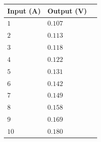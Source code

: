 \begin{table}[H]
\begin{tabular}{|l|l|l|}
\hline%
  \textbf{Input (A)}  & \textbf{Output (V)}  \\
\hline%
  $1$                 &            $0.107$    \\
\hline%
  $2$                 &            $0.113$    \\
\hline%
  $3$                 &            $0.118$    \\
\hline%
  $4$                 &            $0.122$    \\
\hline%
  $5$                 &            $0.131$    \\
\hline%
  $6$                 &            $0.142$    \\
\hline%
  $7$                 &            $0.149$    \\
\hline%
  $8$                 &            $0.158$    \\
\hline%
  $9$                 &            $0.169$    \\
\hline%
  $10$                &            $0.180$    \\
\hline%
\end{tabular}
\end{table}

